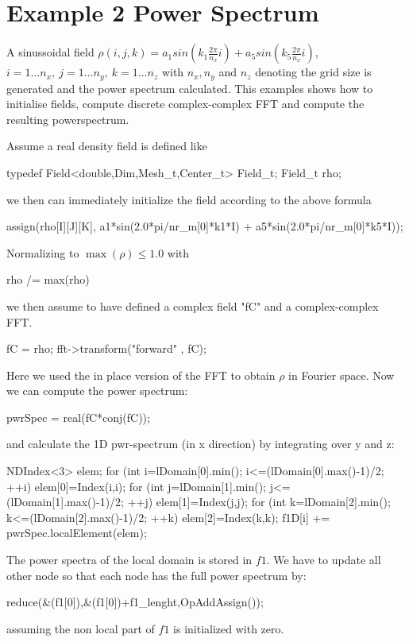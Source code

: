\section{Example 2 Power Spectrum}
A sinussoidal field  $\rho(i,j,k) = a_1sin(k_1 \frac{2\pi}{n_x} i) + a_5 sin(k_5 \frac{2\pi}{n_x} i)$, 
$i= 1 \dots n_x, ~ j= 1 \dots n_y, ~ k= 1 \dots n_z $ with $n_x,n_y$ and $n_z$ denoting the grid size is generated and
the power spectrum calculated. This examples shows how to initialise fields, compute discrete complex-complex FFT and 
compute the resulting powerspectrum.

Assume a real density field is defined like 
\begin{smallcode}
typedef Field<double,Dim,Mesh_t,Center_t>  Field_t;
Field_t rho;
\end{smallcode}
we then can immediately initialize the field according to the above formula 
\begin{smallcode}
assign(rho[I][J][K], a1*sin(2.0*pi/nr_m[0]*k1*I) + 
                     a5*sin(2.0*pi/nr_m[0]*k5*I));
\end{smallcode}
Normalizing to $\max(\rho) \le 1.0 $ with
\begin{smallcode}
rho /= max(rho)
\end{smallcode} 
we then assume to have defined a complex field "fC" and a complex-complex FFT. 
\begin{smallcode}
fC = rho;
fft->transform("forward" , fC);
 \end{smallcode}
Here we used the in place version of the FFT to obtain $\rho $ in Fourier space. Now
we can compute the power spectrum: 
\begin{smallcode}  
pwrSpec = real(fC*conj(fC));
\end{smallcode}
and calculate the 1D pwr-spectrum (in x direction) by integrating over y and z: \\
\begin{code}  
 NDIndex<3> elem;  
 for (int i=lDomain[0].min(); i<=(lDomain[0].max()-1)/2; ++i) {
  elem[0]=Index(i,i);
   for (int j=lDomain[1].min(); j<=(lDomain[1].max()-1)/2; ++j) {
    elem[1]=Index(j,j);
     for (int k=lDomain[2].min(); k<=(lDomain[2].max()-1)/2; ++k) {
       elem[2]=Index(k,k);
       f1D[i] += pwrSpec.localElement(elem);
     }
   }
 }
\end{code}
The power spectra of the local domain is stored in $f1$. We have to update all other node
so that each node has the full power spectrum by:
\begin{smallcode} 
reduce(&(f1[0]),&(f1[0])+f1_lenght,OpAddAssign());
\end{smallcode} 
assuming the non local part of $f1$ is initialized with zero.

